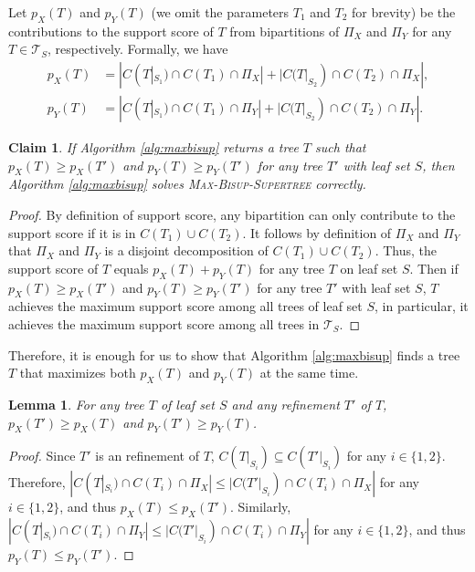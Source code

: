 \documentclass{article}
\newtheorem{lemma}{Lemma}
\newtheorem{claim}{Claim}
\begin{document}
Let $p_X(T)$ and $p_Y(T)$ (we omit the parameters $T_1$ and $T_2$ for brevity) be the contributions to the support score of $T$ from bipartitions of $\Pi_X$ and $\Pi_Y$ for any $T \in \mathcal{T}_S$, respectively. Formally, we have 
\begin{align*}
    p_X(T) &= |C(T|_{S_1}) \cap C(T_1) \cap \Pi_X| + |C(T|_{S_2}) \cap C(T_2) \cap \Pi_X|,\\
    p_Y(T) &= |C(T|_{S_1}) \cap C(T_1) \cap \Pi_Y| + |C(T|_{S_2}) \cap C(T_2) \cap \Pi_Y|.
\end{align*}

\begin{claim}
    If Algorithm \ref{alg:maxbisup} returns a tree $T$ such that $p_X(T) \ge p_X(T')$ and $p_Y(T) \ge p_Y(T')$ for any tree $T'$ with leaf set $S$, then Algorithm \ref{alg:maxbisup} solves \textsc{Max-Bisup-Supertree} correctly.
\end{claim}
\begin{proof}
By definition of support score, any bipartition can only contribute to the support score if it is in $C(T_1) \cup C(T_2)$. It follows by definition of $\Pi_X$ and $\Pi_Y$ that $\Pi_X$ and $\Pi_Y$ is a disjoint decomposition of $C(T_1) \cup C(T_2)$. Thus, the support score of $T$ equals $p_X(T) + p_Y(T)$ for any tree $T$ on leaf set $S$. Then if $p_X(T) \ge p_X(T')$ and $p_Y(T) \ge p_Y(T')$ for any tree $T'$ with leaf set $S$, $T$ achieves the maximum support score among all trees of leaf set $S$, in particular, it achieves the maximum support score among all trees in $\mathcal{T}_S$.
\end{proof}
Therefore, it is enough for us to show that Algorithm \ref{alg:maxbisup} finds a tree $T$ that maximizes both $p_X(T)$ and $p_Y(T)$ at the same time.


\begin{lemma}\label{lem:refine_only_increases}
    For any tree $T$ of leaf set $S$ and any refinement $T'$ of $T$, $p_X(T')\ge p_X(T)$ and $p_Y(T') \ge p_Y(T)$.
\end{lemma}
\begin{proof}
    Since $T'$ is an refinement of $T$, $C(T|_{S_i}) \subseteq C(T'|_{S_i})$ for any $i \in \{1,2\}$. Therefore, $|C(T|_{S_i}) \cap C(T_i) \cap \Pi_X| \le |C(T'|_{S_i}) \cap C(T_i) \cap \Pi_X|$ for any $i \in \{1,2\}$, and thus $p_X(T) \le p_X(T')$. Similarly, $|C(T|_{S_i}) \cap C(T_i) \cap \Pi_Y| \le |C(T'|_{S_i}) \cap C(T_i) \cap \Pi_Y|$ for any $i \in \{1,2\}$, and thus $p_Y(T) \le p_Y(T')$.
\end{proof}
\end{document}
